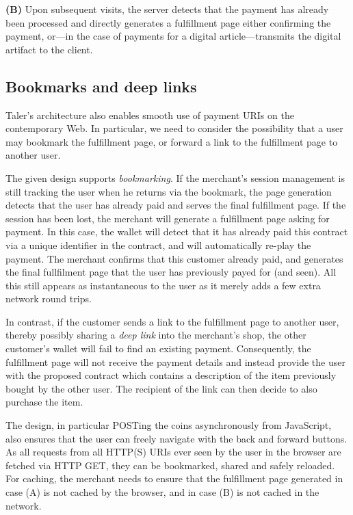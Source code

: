 \documentclass{IEEEtran}
\begin{document}
{\bf (B)} Upon subsequent visits, the server detects that the payment
has already been processed and directly generates a fulfillment page
either confirming the payment, or---in the case of payments for a
digital article---transmits the digital artifact to the client.

\subsection{Bookmarks and deep links}

Taler's architecture also enables smooth use of payment
URIs on the contemporary Web.  In particular, we need to consider the
possibility that a user may bookmark the fulfillment page, or forward
a link to the fulfillment page to another user.

The given design supports {\em bookmarking}. If the merchant's
session management is still tracking the user when he returns via the
bookmark, the page generation detects that the user has already paid
and serves the final fulfillment page.  If the session has been lost,
the merchant will generate a fulfillment page asking for payment.  In
this case, the wallet will detect that it has already paid this
contract via a unique identifier in the contract, and will
automatically re-play the payment.  The merchant confirms that this
customer already paid, and generates the final fullfilment page that the
user has previously payed for (and seen).  All this still appears as
instantaneous to the user as it merely adds a few extra network round trips.

In contrast, if the customer sends a link to the fulfillment page to
another user, thereby possibly sharing a {\em deep link} into the
merchant's shop, the other customer's wallet will fail to find an
existing payment.  Consequently, the fulfillment page will not receive
the payment details and instead provide the user with the proposed
contract which contains a description of the item previously bought by
the other user. The recipient of the link can then decide to also
purchase the item.

The design, in particular POSTing the coins asyn\-chro\-nous\-ly from
JavaScript, also ensures that the user can freely navigate with
the back and forward buttons.  As all requests from all HTTP(S)
URIs ever seen by the user in the browser are fetched via HTTP
GET, they can be bookmarked, shared and safely reloaded.  For
caching, the merchant needs to ensure that the fulfillment
page generated in case (A) is not cached by the browser,
and in case (B) is not cached in the network.
\end{document}
